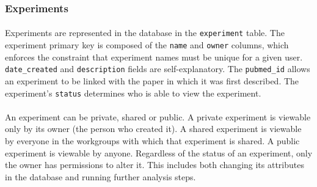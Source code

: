 \subsubsection{Experiments}
\label{sec:model_experiments}

\paragraph{}
Experiments are represented in the database in the \texttt{experiment} table. The experiment primary key is composed of the \texttt{name} and \texttt{owner} columns, which enforces the constraint that experiment names must be unique for a given user. \texttt{date\_created} and \texttt{description} fields are self-explanatory. The \texttt{pubmed\_id} allows an experiment to be linked with the paper in which it was first described. The experiment's \texttt{status} determines who is able to view the experiment.



\paragraph{}
An experiment can be private, shared or public. A private experiment is viewable only by its owner (the person who created it). A shared experiment is viewable by everyone in the workgroups with which that experiment is shared. A public experiment is viewable by anyone. Regardless of the status of an experiment, only the owner has permissions to alter it. This includes both changing its attributes in the database and running further analysis steps.
